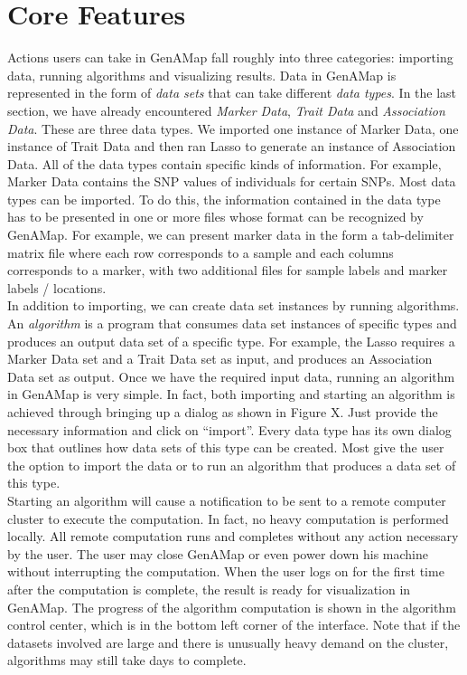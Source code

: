 \documentclass[12pt]{article}
\begin{document}
\section{Core Features}

Actions users can take in GenAMap fall roughly into three categories: importing data, running algorithms and visualizing results. Data in GenAMap is represented in the form of {\it data sets} that can take different {\it data types}. In the last section, we have already encountered {\it Marker Data}, {\it Trait Data} and {\it Association Data}. These are three data types. We imported one instance of Marker Data, one instance of Trait Data and then ran Lasso to generate an instance of Association Data. All of the data types contain specific kinds of information. For example, Marker Data contains the SNP values of individuals for certain SNPs. Most data types can be imported. To do this, the information contained in the data type has to be presented in one or more files whose format can be recognized by GenAMap. For example, we can present marker data in the form a tab-delimiter matrix file where each row corresponds to a sample and each columns corresponds to a marker, with two additional files for sample labels and marker labels / locations.\\

In addition to importing, we can create data set instances by running algorithms. An {\it algorithm} is a program that consumes data set instances of specific types and produces an output data set of a specific type. For example, the Lasso requires a Marker Data set and a Trait Data set as input, and produces an Association Data set as output. Once we have the required input data, running an algorithm in GenAMap is very simple. In fact, both importing and starting an algorithm is achieved through bringing up a dialog as shown in Figure X. Just provide the necessary information and click on ``import''. Every data type has its own dialog box that outlines how data sets of this type can be created. Most give the user the option to import the data or to run an algorithm that produces a data set of this type. \\

Starting an algorithm will cause a notification to be sent to a remote computer cluster to execute the computation. In fact, no heavy computation is performed locally. All remote computation runs and completes without any action necessary by the user. The user may close GenAMap or even power down his machine without interrupting the computation. When the user logs on for the first time after the computation is complete, the result is ready for visualization in GenAMap. The progress of the algorithm computation is shown in the algorithm control center, which is in the bottom left corner of the interface. Note that if the datasets involved are large and there is unusually heavy demand on the cluster, algorithms may still take days to complete. \\
\end{document}
